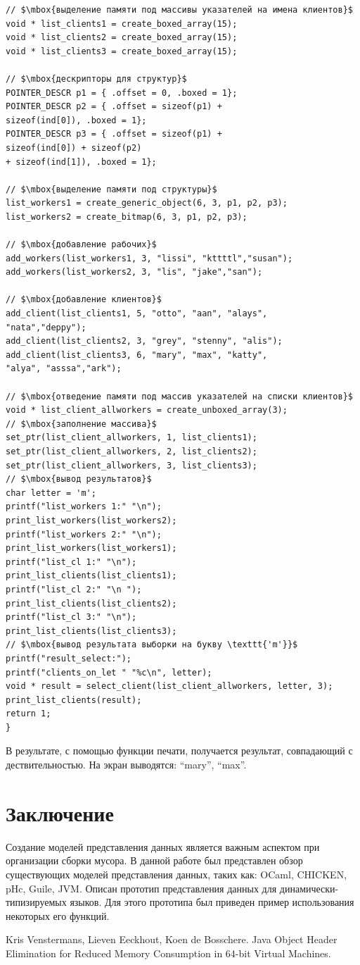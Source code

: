 \begin{lstlisting}[mathescape]
// $\mbox{выделение памяти под массивы указателей на имена клиентов}$
void * list_clients1 = create_boxed_array(15);  
void * list_clients2 = create_boxed_array(15);
void * list_clients3 = create_boxed_array(15);

// $\mbox{дескрипторы для структур}$
POINTER_DESCR p1 = { .offset = 0, .boxed = 1};
POINTER_DESCR p2 = { .offset = sizeof(p1) + 
sizeof(ind[0]), .boxed = 1};
POINTER_DESCR p3 = { .offset = sizeof(p1) + 
sizeof(ind[0]) + sizeof(p2)
+ sizeof(ind[1]), .boxed = 1};

// $\mbox{выделение памяти под структуры}$
list_workers1 = create_generic_object(6, 3, p1, p2, p3);
list_workers2 = create_bitmap(6, 3, p1, p2, p3);

// $\mbox{добавление рабочих}$
add_workers(list_workers1, 3, "lissi", "kttttl","susan");
add_workers(list_workers2, 3, "lis", "jake","san");

// $\mbox{добавление клиентов}$
add_client(list_clients1, 5, "otto", "aan", "alays",
"nata","deppy");
add_client(list_clients2, 3, "grey", "stenny", "alis");
add_client(list_clients3, 6, "mary", "max", "katty",
"alya", "asssa","ark");

// $\mbox{отведение памяти под массив указателей на списки клиентов}$
void * list_client_allworkers = create_unboxed_array(3);
// $\mbox{заполнение массива}$
set_ptr(list_client_allworkers, 1, list_clients1);
set_ptr(list_client_allworkers, 2, list_clients2);
set_ptr(list_client_allworkers, 3, list_clients3);
// $\mbox{вывод результатов}$
char letter = 'm';
printf("list_workers 1:" "\n");
print_list_workers(list_workers2);
printf("list_workers 2:" "\n");
print_list_workers(list_workers1);
printf("list_cl 1:" "\n");
print_list_clients(list_clients1);
printf("list_cl 2:" "\n ");
print_list_clients(list_clients2);
printf("list_cl 3:" "\n");
print_list_clients(list_clients3);
// $\mbox{вывод результата выборки на букву \texttt{'m'}}$
printf("result_select:");
printf("clients_on_let " "%c\n", letter);
void * result = select_client(list_client_allworkers, letter, 3);
print_list_clients(result);
return 1;
}
\end{lstlisting}

В результате, с помощью функции печати, получается результат, совпадающий с дествительностью. На экран выводятся: ``mary'', ``max''.


\section*{Заключение}

Создание моделей представления данных является важным аспектом при организации сборки мусора. В данной работе был представлен
обзор существующих моделей представления данных, таких как: OCaml, CHICKEN, pHc, Guile, JVM. Описан прототип представления данных для динамически-типизируемых
языков. Для этого прототипа был приведен пример использования некоторых его функций.

\begin{thebibliography}{99}
Kris Venstermans, Lieven Eeckhout, Koen de Bosschere.
Java Object Header Elimination for Reduced Memory Consumption in 64-bit Virtual Machines.
\end{thebibliography}
